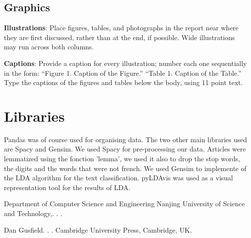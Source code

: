 \documentclass[11pt]{article}
\begin{document}
\label{sect:pdf}

\subsection{Graphics}

{\bf Illustrations}: Place figures, tables, and photographs in the
report near where they are first discussed, rather than at the end, if
possible.  Wide illustrations may run across both columns.

{\bf Captions}: Provide a caption for every illustration; number each one
sequentially in the form:  ``Figure 1. Caption of the Figure.'' ``Table 1.
Caption of the Table.''  Type the captions of the figures and
tables below the body, using 11 point text.
\section{Libraries}
Pandas was of course used for organising data.
The two other main libraries used are Spacy and Gensim.
We used Spacy for pre-processing our data. Articles were lemmatized using the fonction 'lemma', we used it also to drop the stop words, the digits and the words that were not french.
We used Gensim to implemente of the LDA algorithm for the text classification.
pyLDAvis was used as a visual representation tool for the results of LDA.


\begin{thebibliography}{}

Department of Computer Science and Engineering Nanjing University of Science and Technology,.
.
.


Dan Gusfield.
.
.
\newblock Cambridge University Press, Cambridge, UK.

\end{thebibliography}
\end{document}
